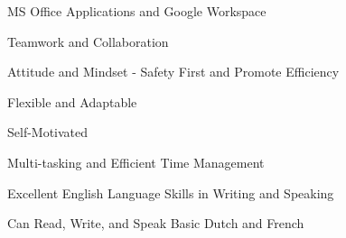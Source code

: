 



\begin{cvparagraph}



\begin{cventries}
  \cventry
{} %
{} %
{} %
{} %
{ %
\begin{cvitems*}
	\item{MS Office Applications and Google Workspace}
	\item{Teamwork and Collaboration}
	\item{Attitude and Mindset - Safety First and Promote Efficiency}
	\item{Flexible and Adaptable}
	\item{Self-Motivated}
	\item{Multi-tasking and Efficient Time Management}
	\item{Excellent English Language Skills in Writing and Speaking}
	\item{Can Read, Write, and Speak Basic Dutch and French}
\end{cvitems*}
}
\end{cventries}



\end{cvparagraph}

